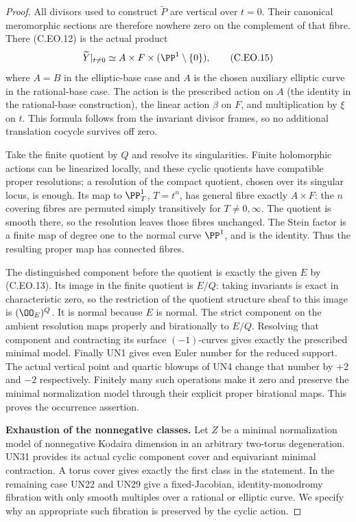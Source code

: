 \begin{proof}
All divisors used to construct
$\widetilde P$ are vertical over
$t=0$. Their canonical meromorphic
sections are therefore nowhere
zero on the complement of that
fibre. There (C.EO.12) is the
actual product
\[
 \widetilde Y|_{t\ne0}
       \simeq A\times F\times(\PP^1\setminus\{0\}),
                                                               \tag{C.EO.15}
\]
where $A=B$ in the elliptic-base
case and $A$ is the chosen auxiliary
elliptic curve in the rational-base
case. The action is the prescribed
action on $A$ (the identity in the
rational-base construction),
the linear action $\beta$ on $F$,
and multiplication by $\xi$ on
$t$. This formula follows from
the invariant divisor frames,
so no additional translation
cocycle survives off zero.

Take the finite quotient by $Q$
and resolve its singularities.
Finite holomorphic actions can
be linearized locally, and these
cyclic quotients have compatible
proper resolutions; a resolution
of the compact quotient, chosen
over its singular locus, is
enough. Its map to
$\PP^1_T$, $T=t^n$, has general
fibre exactly $A\times F$:
the $n$ covering fibres are
permuted simply transitively
for $T\ne0,\infty$. The quotient
is smooth there, so the
resolution leaves those fibres
unchanged. The Stein factor is
a finite map of degree one
to the normal curve $\PP^1$,
and is the identity. Thus
the resulting proper map has
connected fibres.

The distinguished component
before the quotient is exactly
the given $E$ by (C.EO.13).
Its image in the finite quotient
is $E/Q$: taking invariants
is exact in characteristic zero,
so the restriction of the
quotient structure sheaf to
this image is
$(\OO_E)^Q$. It is normal
because $E$ is normal. The
strict component on the ambient
resolution maps properly and
birationally to $E/Q$.
Resolving that component and
contracting its surface
$(-1)$-curves gives exactly
the prescribed minimal model.
Finally UN1 gives even Euler
number for the reduced support.
The actual vertical point and
quartic blowups of UN4 change
that number by $+2$ and $-2$
respectively. Finitely many
such operations make it zero
and preserve the minimal
normalization model through
their explicit proper
birational maps. This proves
the occurrence assertion.

\par\medskip\noindent\textbf{Exhaustion of the nonnegative classes.}
Let $Z$ be a minimal normalization
model of nonnegative Kodaira
dimension in an arbitrary
two-torus degeneration. UN31
provides its actual cyclic
component cover and equivariant
minimal contraction. A torus
cover gives exactly the first
class in the statement. In
the remaining case UN22 and
UN29 give a fixed-Jacobian,
identity-monodromy fibration
with only smooth multiples
over a rational or elliptic
curve. We specify why an
appropriate such fibration
is preserved by the cyclic
action.


\end{proof}
